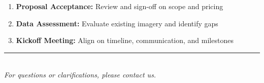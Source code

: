 \documentclass[11pt,a4paper]{article}
\begin{document}
\begin{enumerate}[leftmargin=*]
\item \textbf{Proposal Acceptance:} Review and sign-off on scope and pricing
\item \textbf{Data Assessment:} Evaluate existing imagery and identify gaps
\item \textbf{Kickoff Meeting:} Align on timeline, communication, and milestones

\end{enumerate}

\vfill

\begin{center}
\textcolor{primary}{\rule{8cm}{0.5pt}}\\[0.3cm]
\textit{For questions or clarifications, please contact us.}
\end{center}
\end{document}
